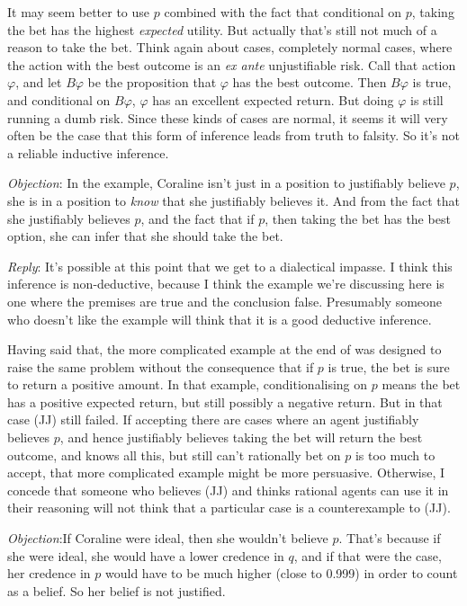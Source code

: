 It may seem better to use $p$ combined with the fact that conditional on $p$, taking the bet has the highest \textit{expected} utility. But actually that's still not much of a reason to take the bet. Think again about cases, completely normal cases, where the action with the best outcome is an \textit{ex ante} unjustifiable risk. Call that action $\varphi$, and let $B \varphi$ be the proposition that $\varphi$ has the best outcome. Then $B \varphi$ is true, and conditional on $B \varphi$, $\varphi$ has an excellent expected return. But doing $\varphi$ is still running a dumb risk. Since these kinds of cases are normal, it seems it will very often be the case that this form of inference leads from truth to falsity. So it's not a reliable inductive inference.

\textit{Objection}:
In the example, Coraline isn't just in a position to justifiably believe $p$, she is in a position to \textit{know} that she justifiably believes it. And from the fact that she justifiably believes $p$, and the fact that if $p$, then taking the bet has the best option, she can infer that she should take the bet.

\textit{Reply}:
It's possible at this point that we get to a dialectical impasse. I think this inference is non-deductive, because I think the example we're discussing here is one where the premises are true and the conclusion false. Presumably someone who doesn't like the example will think that it is a good deductive inference.

Having said that, the more complicated example at the end of \citet{Weatherson2005-WEACWD} was designed to raise the same problem without the consequence that if $p$ is true, the bet is sure to return a positive amount. In that example, conditionalising on $p$ means the bet has a positive expected return, but still possibly a negative return. But in that case (JJ) still failed. If accepting there are cases where an agent justifiably believes $p$, and hence justifiably believes taking the bet will return the best outcome, and knows all this, but still can't rationally bet on $p$ is too much to accept, that more complicated example might be more persuasive. Otherwise, I concede that someone who believes (JJ) and thinks rational agents can use it in their reasoning will not think that a particular case is a counterexample to (JJ).

\textit{Objection}:If Coraline were ideal, then she wouldn't believe $p$. That's because if she were ideal, she would have a lower credence in $q$, and if that were the case, her credence in $p$ would have to be much higher (close to 0.999) in order to count as a belief. So her belief is not justified.

